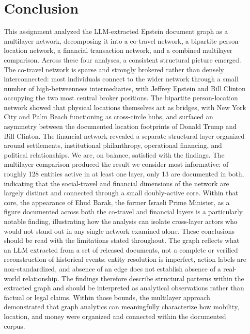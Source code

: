 \section{Conclusion}
This assignment analyzed the LLM-extracted Epstein document graph as a multilayer network, decomposing it into a co-travel network, a bipartite person-location network, a financial transaction network, and a combined multilayer comparison. Across these four analyses, a consistent structural picture emerged. The co-travel network is sparse and strongly brokered rather than densely interconnected: most individuals connect to the wider network through a small number of high-betweenness intermediaries, with Jeffrey Epstein and Bill Clinton occupying the two most central broker positions. The bipartite person-location network showed that physical locations themselves act as bridges, with New York City and Palm Beach functioning as cross-circle hubs, and surfaced an asymmetry between the documented location footprints of Donald Trump and Bill Clinton. The financial network revealed a separate structural layer organized around settlements, institutional philanthropy, operational financing, and political relationships.
We are, on balance, satisfied with the findings. The multilayer comparison produced the result we consider most informative: of roughly 128 entities active in at least one layer, only 13 are documented in both, indicating that the social-travel and financial dimensions of the network are largely distinct and connected through a small doubly-active core. Within that core, the appearance of Ehud Barak, the former Israeli Prime Minister, as a figure documented across both the co-travel and financial layers is a particularly notable finding, illustrating how the analysis can isolate cross-layer actors who would not stand out in any single network examined alone.
These conclusions should be read with the limitations stated throughout. The graph reflects what an LLM extracted from a set of released documents, not a complete or verified reconstruction of historical events; entity resolution is imperfect, action labels are non-standardized, and absence of an edge does not establish absence of a real-world relationship. The findings therefore describe structural patterns within the extracted graph and should be interpreted as analytical observations rather than factual or legal claims. Within those bounds, the multilayer approach demonstrated that graph analytics can meaningfully characterize how mobility, location, and money were organized and connected within the documented corpus.
